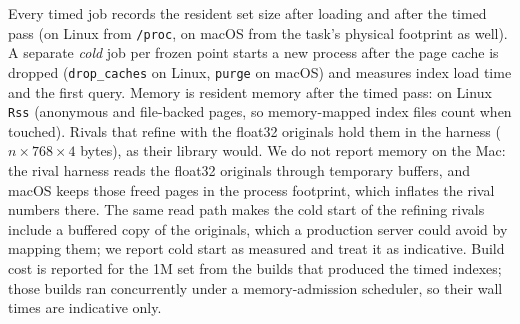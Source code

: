 Every timed job records the resident set size after loading and after the timed pass (on Linux from
\texttt{/proc}, on macOS from the task's physical footprint as well). A separate \emph{cold} job per
frozen point starts a new process after the page cache is dropped (\texttt{drop\_caches} on Linux,
\texttt{purge} on macOS) and measures index load time and the first query. Memory is resident memory after the timed pass: on Linux \texttt{Rss} (anonymous and file-backed pages, so
memory-mapped index files count when touched). Rivals that refine with the float32 originals hold them in
the harness ($n \times 768 \times 4$ bytes), as their library would. We do not report memory on the Mac:
the rival harness reads the float32 originals through temporary buffers, and macOS keeps those freed pages
in the process footprint, which inflates the rival numbers there. The same read path makes the cold
start of the refining rivals include a buffered copy of the originals, which a production server could
avoid by mapping them; we report cold start as measured and treat it as indicative. Build cost is reported for the 1M set from the builds that produced the timed indexes;
those builds ran concurrently under a memory-admission scheduler, so their wall times are indicative
only.
